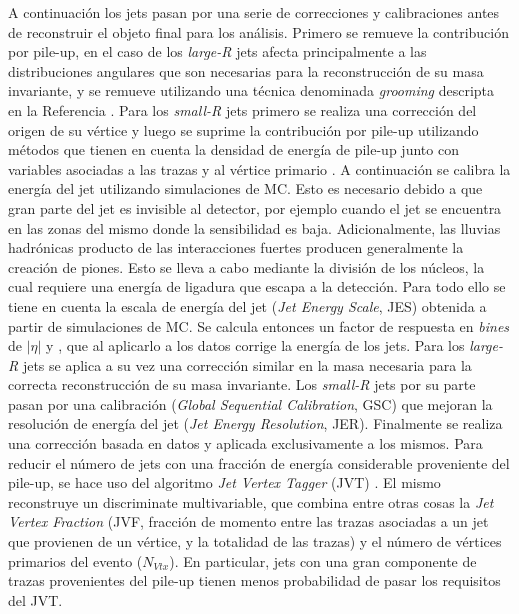 A continuación los jets pasan por una serie de correcciones y calibraciones antes de reconstruir el objeto final para los análisis. Primero se remueve la contribución por pile-up, en el caso de los \textit{large-R} jets afecta principalmente a las distribuciones angulares que son necesarias para la reconstrucción de su masa invariante, y se remueve utilizando una técnica denominada \textit{grooming} descripta en la Referencia \cite{Krohn_2010}. Para los \textit{small-R} jets primero se realiza una corrección del origen de su vértice y luego se suprime la contribución por pile-up utilizando métodos que tienen en cuenta la densidad de energía de pile-up \cite{PERF-2016-04} junto con variables asociadas a las trazas y al vértice primario \cite{PERF-2014-03}.
A continuación se calibra la energía del jet utilizando simulaciones de MC.
Esto es necesario debido a que gran parte del jet es invisible al detector, por ejemplo cuando el jet se encuentra en las zonas del mismo donde la sensibilidad es baja. 
Adicionalmente, las lluvias hadrónicas producto de las interacciones fuertes producen generalmente la creación de piones. Esto se lleva a cabo mediante la división de los núcleos, la cual requiere una energía de ligadura que escapa a la detección. Para todo ello se tiene en cuenta
la escala de energía del jet (\textit{Jet Energy Scale}, JES) \cite{JETM-2018-05} obtenida a partir de simulaciones de MC. Se calcula entonces un factor de respuesta en \textit{bines} de $|\eta|$ y \pt, que al aplicarlo a los datos corrige la energía de los jets. Para los \textit{large-R} jets se aplica a su vez una corrección similar en la masa necesaria para la correcta reconstrucción de su masa invariante. Los \textit{small-R} jets por su parte pasan por una calibración (\textit{Global Sequential Calibration}, GSC) que mejoran la resolución de energía del jet (\textit{Jet Energy Resolution}, JER). Finalmente se realiza una corrección basada en datos y aplicada exclusivamente a los mismos.
Para reducir el número de jets con una fracción de energía considerable proveniente del pile-up, se hace uso del algoritmo \textit{Jet Vertex Tagger} (JVT) \cite{ATLAS-CONF-2014-018}. El mismo reconstruye un discriminate multivariable, que combina entre otras cosas la \textit{Jet Vertex Fraction} (JVF, fracción de momento entre las trazas asociadas a un jet que provienen de un vértice, y la totalidad de las trazas) y el número de vértices primarios del evento ($N_{Vtx}$). En particular, jets con una gran componente de trazas provenientes del pile-up tienen menos probabilidad de pasar los requisitos del JVT. 




